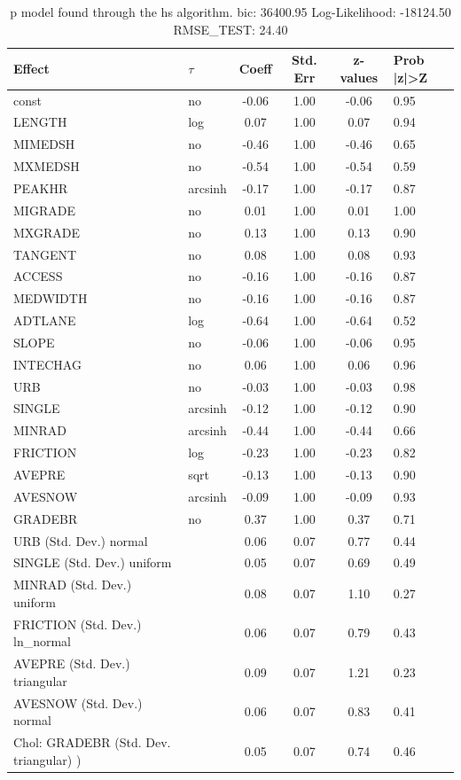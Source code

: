 \begin{table}
	\caption{p model found through the hs algorithm. bic: 36400.95 Log-Likelihood: -18124.50 RMSE_TEST: 24.40}
	\begin{center}
		\begin{tabular}{|l|l|c|c|c|l|}
			\hline
			Effect & $\tau$ & Coeff & Std. Err & z-values & Prob |z|>Z \\
			\hline
			const & no & -0.06 & 1.00 & -0.06 & 0.95 \\
			\hline
			LENGTH & log & 0.07 & 1.00 & 0.07 & 0.94 \\
			\hline
			MIMEDSH & no & -0.46 & 1.00 & -0.46 & 0.65 \\
			\hline
			MXMEDSH & no & -0.54 & 1.00 & -0.54 & 0.59 \\
			\hline
			PEAKHR & arcsinh & -0.17 & 1.00 & -0.17 & 0.87 \\
			\hline
			MIGRADE & no & 0.01 & 1.00 & 0.01 & 1.00 \\
			\hline
			MXGRADE & no & 0.13 & 1.00 & 0.13 & 0.90 \\
			\hline
			TANGENT & no & 0.08 & 1.00 & 0.08 & 0.93 \\
			\hline
			ACCESS & no & -0.16 & 1.00 & -0.16 & 0.87 \\
			\hline
			MEDWIDTH & no & -0.16 & 1.00 & -0.16 & 0.87 \\
			\hline
			ADTLANE & log & -0.64 & 1.00 & -0.64 & 0.52 \\
			\hline
			SLOPE & no & -0.06 & 1.00 & -0.06 & 0.95 \\
			\hline
			INTECHAG & no & 0.06 & 1.00 & 0.06 & 0.96 \\
			\hline
			URB & no & -0.03 & 1.00 & -0.03 & 0.98 \\
			\hline
			SINGLE & arcsinh & -0.12 & 1.00 & -0.12 & 0.90 \\
			\hline
			MINRAD & arcsinh & -0.44 & 1.00 & -0.44 & 0.66 \\
			\hline
			FRICTION & log & -0.23 & 1.00 & -0.23 & 0.82 \\
			\hline
			AVEPRE & sqrt & -0.13 & 1.00 & -0.13 & 0.90 \\
			\hline
			AVESNOW & arcsinh & -0.09 & 1.00 & -0.09 & 0.93 \\
			\hline
			GRADEBR & no & 0.37 & 1.00 & 0.37 & 0.71 \\
			\hline
			URB (Std. Dev.) normal &  & 0.06 & 0.07 & 0.77 & 0.44 \\
			\hline
			SINGLE (Std. Dev.) uniform &  & 0.05 & 0.07 & 0.69 & 0.49 \\
			\hline
			MINRAD (Std. Dev.) uniform &  & 0.08 & 0.07 & 1.10 & 0.27 \\
			\hline
			FRICTION (Std. Dev.) ln_normal &  & 0.06 & 0.07 & 0.79 & 0.43 \\
			\hline
			AVEPRE (Std. Dev.) triangular &  & 0.09 & 0.07 & 1.21 & 0.23 \\
			\hline
			AVESNOW (Std. Dev.) normal &  & 0.06 & 0.07 & 0.83 & 0.41 \\
			\hline
			 Chol: GRADEBR (Std. Dev. triangular) ) &  & 0.05 & 0.07 & 0.74 & 0.46 \\
			\hline
		\end{tabular}
	\end{center}
\end{table}